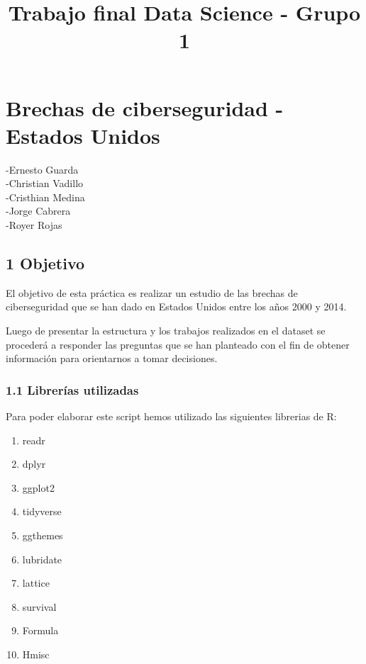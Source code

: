 \documentclass[
]{article}
\title{Trabajo final Data Science - Grupo 1}
\author{}
\date{\vspace{-2.5em}}
\providecommand{\tightlist}{%
  \setlength{\itemsep}{0pt}\setlength{\parskip}{0pt}}
\begin{document}
\maketitle

\hypertarget{brechas-de-ciberseguridad---estados-unidos}{%
\section{Brechas de ciberseguridad - Estados
Unidos}\label{brechas-de-ciberseguridad---estados-unidos}}

-Ernesto Guarda\\
-Christian Vadillo\\
-Cristhian Medina\\
-Jorge Cabrera\\
-Royer Rojas

\hypertarget{objetivo}{%
\subsection{1 Objetivo}\label{objetivo}}

El objetivo de esta práctica es realizar un estudio de las brechas de
ciberseguridad que se han dado en Estados Unidos entre los años 2000 y
2014.

Luego de presentar la estructura y los trabajos realizados en el dataset
se procederá a responder las preguntas que se han planteado con el fin
de obtener información para orientarnos a tomar decisiones.

\hypertarget{libreruxedas-utilizadas}{%
\subsubsection{1.1 Librerías utilizadas}\label{libreruxedas-utilizadas}}

Para poder elaborar este script hemos utilizado las siguientes librerias
de R:

\begin{enumerate}
\def\labelenumi{\arabic{enumi}.}
\tightlist
\item
  readr
\item
  dplyr
\item
  ggplot2
\item
  tidyverse
\item
  ggthemes
\item
  lubridate
\item
  lattice
\item
  survival
\item
  Formula
\item
  Hmisc
\end{enumerate}
\end{document}
